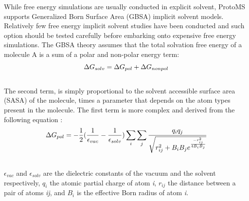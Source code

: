 \documentclass[letterpaper,10pt,english]{manual}
\begin{document}
While free energy simulations are usually conducted in explicit solvent, ProtoMS supports Generalized Born Surface Area (GBSA) implicit solvent models. Relatively few free energy implicit solvent studies have been conducted and such option should be tested carefully before embarking onto expensive free energy simulations. The GBSA theory assumes that the total solvation free energy of a molecule A is a sum of a polar and non-polar energy term:
\hypertarget{equation-gb1}{}\begin{gather}
\begin{split}\Delta G_{solv} = \Delta G_{pol} + \Delta G_{nonpol}\end{split}\label{protoms-gb1}\\\begin{split}\end{split}\notag
\end{gather}
The second term, is simply proportional to the solvent accessible surface area (SASA) of the molecule, times a parameter that depends on the atom types present in the molecule. The first term is more complex and derived from the following equation :
\hypertarget{equation-gb2}{}\begin{gather}
\begin{split}\Delta G_{pol} = -\frac{1}{2}(\frac{1}{\epsilon_{vac}}-\frac{1}{\epsilon_{solv}})  \sum_{i}\sum_{j} \frac{q_{i}q_{j}}{\sqrt{r^{2}_{ij} + B_{i}B_{j} e^{\frac{-r^{2}_{ij}}{4B_{i}B_{j}}}   } }\end{split}\label{protoms-gb2}\\\begin{split}\end{split}\notag
\end{gather}
$\epsilon_{vac}$ and $\epsilon_{solv}$ are the dielectric constants of the vacuum and the solvent respectively, $q_{i}$ the atomic partial charge of atom \emph{i}, $r_{ij}$ the distance between a pair of atoms \emph{ij}, and $B_{i}$ is the effective Born radius of atom \emph{i}.
\end{document}
